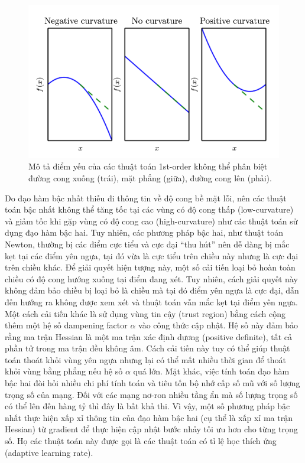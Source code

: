 \begin{figure}[htp]
\centering
\includegraphics[width=120 mm]{images/hessian.png}
\caption{Mô tả điểm yếu của các thuật toán 1st-order không thể phân biệt đường cong xuống (trái), mặt phẳng (giữa), đường cong lên (phải).\cite{goodfellow2016deeplearning}}
\label{fig:hessian}
\end{figure}

Do đạo hàm bậc nhất thiếu đi thông tin về độ cong bề mặt lỗi, nên các thuật toán bậc nhất không thể tăng tốc tại các vùng có độ cong thấp (low-curvature) và giảm tốc khi gặp vùng có độ cong cao (high-curvature) như các thuật toán sử dụng đạo hàm bậc hai. Tuy nhiên, các phương pháp bậc hai, như thuật toán Newton, thường bị các điểm cực tiểu và cực đại ``thu hút'' nên dễ dàng bị mắc kẹt tại các điểm yên ngựa, tại đó vừa là cực tiểu trên chiều này nhưng là cực đại trên chiều khác. Để giải quyết hiện tượng này, một số cải tiến loại bỏ hoàn toàn chiều có độ cong hướng xuống tại điểm đang xét. Tuy nhiên, cách giải quyết này không đảm bảo chiều bị loại bỏ là chiều mà tại đó điểm yên ngựa là cực đại, dẫn đến hướng ra không được xem xét và thuật toán vẫn mắc kẹt tại điểm yên ngựa. Một cách cải tiến khác là sử dụng vùng tin cậy (trust region) bằng cách cộng thêm một hệ số dampening factor $\alpha$ vào công thức cập nhật. Hệ số này đảm bảo rằng ma trận Hessian là một ma trận xác định dương (positive definite), tất cả phần tử trong ma trận đều không âm. Cách cải tiến này tuy có thể giúp thuật toán thoát khỏi vùng yên ngựa nhưng lại có thể mất nhiều thời gian để thoát khỏi vùng bằng phẳng nếu hệ số $\alpha$ quá lớn. Mặt khác, việc tính toán đạo hàm bậc hai đòi hỏi nhiều chi phí tính toán và tiêu tốn bộ nhớ cấp số mũ với số lượng trọng số của mạng. Đối với các mạng nơ-ron nhiều tầng ẩn mà số lượng trọng số có thể lên đến hàng tỷ thì đây là bất khả thi. Vì vậy, một số phương pháp bậc nhất thực hiện xấp xỉ thông tin của đạo hàm bậc hai (cụ thể là xấp xỉ ma trận Hessian) từ gradient để thực hiện cập nhật bước nhảy tối ưu hơn cho từng trọng số. Họ các thuật toán này được gọi là các thuật toán có tỉ lệ học thích ứng (adaptive learning rate).

